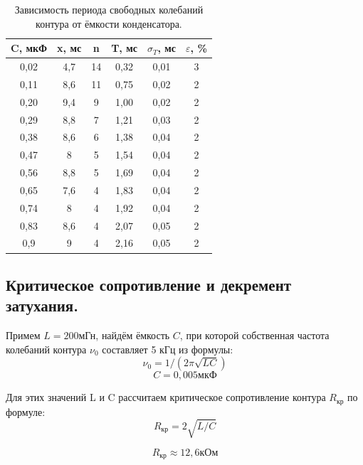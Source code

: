 \documentclass[a4paper, 12pt, twoside]{article}
\begin{document}
\begin{table}[H]
	\centering
	\caption{Зависимость периода свободных колебаний контура от ёмкости конденсатора.}
	\label{table1}
	\begin{tabular}{|c|c|c|c|c|c|}
		\hline
		C, мкФ & x, мс & n  & T, мс & $\sigma_{T}$, мс & $\varepsilon$, \% \\ \hline
		0,02   & 4,7   & 14 & 0,32  & 0,01      & 3           \\ \hline
		0,11   & 8,6   & 11 & 0,75  & 0,02      & 2           \\ \hline
		0,20   & 9,4   & 9  & 1,00  & 0,02      & 2           \\ \hline
		0,29   & 8,8   & 7  & 1,21  & 0,03      & 2           \\ \hline
		0,38   & 8,6   & 6  & 1,38  & 0,04      & 2           \\ \hline
		0,47   & 8     & 5  & 1,54  & 0,04      & 2           \\ \hline
		0,56   & 8,8   & 5  & 1,69  & 0,04      & 2           \\ \hline
		0,65   & 7,6   & 4  & 1,83  & 0,04      & 2           \\ \hline
		0,74   & 8     & 4  & 1,92  & 0,04      & 2           \\ \hline
		0,83   & 8,6   & 4  & 2,07  & 0,05      & 2           \\ \hline
		0,9    & 9     & 4  & 2,16  & 0,05      & 2           \\ \hline
	\end{tabular}
\end{table}

\subsection{Критическое сопротивление и декремент затухания.}

Примем $L=200{\text{мГн}}$, найдём ёмкость $C$, при которой собственная частота колебаний контура $\nu_{0}$ составляет 5 кГц из формулы:
\begin{equation}
\nu_{0} = 1/(2\pi\sqrt{LC})
\end{equation}
$$ C = 0,005 \text{мкФ}$$

Для этих значений L и C рассчитаем критическое сопротивление контура $R_{кр}$ по формуле:
\begin{equation}
R_{\text{кр}} = 2\sqrt{L/C}
\end{equation}

$$ R_{\text{кр}} \approx 12,6 \text{кОм} $$
\end{document}
